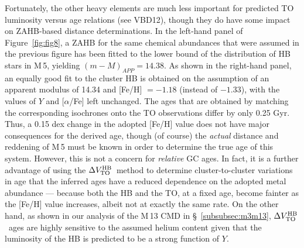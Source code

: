 \documentclass[12pt,preprint]{aastex}
\newcommand\delv{\Delta V^{\rm HB}_{\rm TO}}
\begin{document}
Fortunately, the other heavy elements are much less important for predicted TO
luminosity versus age relations (see VBD12), though they do have some
impact on ZAHB-based distance determinations.  In the left-hand panel of
Figure~\ref{fig:fig8}, a ZAHB for the same chemical abundances that were assumed
in the previous figure has been fitted to the lower bound of the distribution of
HB stars in M$\,$5, yielding $(m-M)_{APP} = 14.38$.  As shown in the right-hand
panel, an equally good fit to the cluster HB is obtained on the assumption of 
an apparent modulus of 14.34 and [Fe/H] $= -1.18$ (instead of $-1.33$), with
the values of $Y$ and [$\alpha$/Fe] left unchanged.  The ages that are obtained
by matching the corresponding isochrones onto the TO observations differ by only
0.25 Gyr.  Thus, a 0.15 dex change in the adopted [Fe/H] value does not have
major consequences for the derived age, though (of course) the {\it actual}
distance and reddening of M$\,$5 must be known in order to determine the true
age of this system.  However, this is not a concern for {\it relative} GC ages.
In fact, it is a further advantage of using the $\delv$\ method to determine
cluster-to-cluster variations in age that the inferred ages have a reduced
dependence on the adopted metal abundance --- because both the HB and the TO,
at a fixed age, become fainter as the [Fe/H] value increases, albeit not at
exactly the same rate.  On the other hand, as shown in our analysis of the
M$\,$13 CMD in \S~\ref{subsubsec:m3m13}, $\delv$\ ages are highly sensitive to
the assumed helium content given that the luminosity of the HB is predicted to
be a strong function of $Y$.
\end{document}
